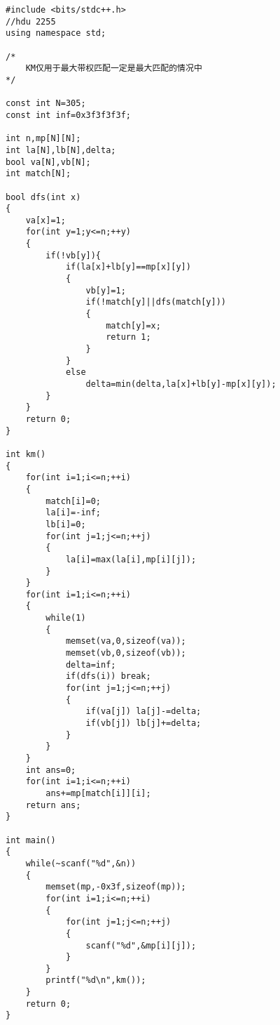 \begin{lstlisting}
#include <bits/stdc++.h>
//hdu 2255
using namespace std;

/*
	KM仅用于最大带权匹配一定是最大匹配的情况中
*/

const int N=305;
const int inf=0x3f3f3f3f;

int n,mp[N][N];
int la[N],lb[N],delta;
bool va[N],vb[N];
int match[N];

bool dfs(int x)
{
	va[x]=1;
	for(int y=1;y<=n;++y)
	{
		if(!vb[y]){
			if(la[x]+lb[y]==mp[x][y])
			{
				vb[y]=1;
				if(!match[y]||dfs(match[y]))
				{
					match[y]=x;
					return 1;
				}
			}
			else
				delta=min(delta,la[x]+lb[y]-mp[x][y]);
		}
	}
	return 0;
}

int km()
{
	for(int i=1;i<=n;++i)
	{
		match[i]=0;
		la[i]=-inf;
		lb[i]=0;
		for(int j=1;j<=n;++j)
		{
			la[i]=max(la[i],mp[i][j]);
		}
	}
	for(int i=1;i<=n;++i)
	{
		while(1)
		{
			memset(va,0,sizeof(va));
			memset(vb,0,sizeof(vb));
			delta=inf;
			if(dfs(i)) break;
			for(int j=1;j<=n;++j)
			{
				if(va[j]) la[j]-=delta;
				if(vb[j]) lb[j]+=delta;
			}
		}
	}
	int ans=0;
	for(int i=1;i<=n;++i)
		ans+=mp[match[i]][i];
	return ans;
}

int main()
{
	while(~scanf("%d",&n))
	{
		memset(mp,-0x3f,sizeof(mp));
		for(int i=1;i<=n;++i)
		{
			for(int j=1;j<=n;++j)
			{
				scanf("%d",&mp[i][j]);
			}
		}
		printf("%d\n",km());
	}
	return 0;
}
\end{lstlisting}